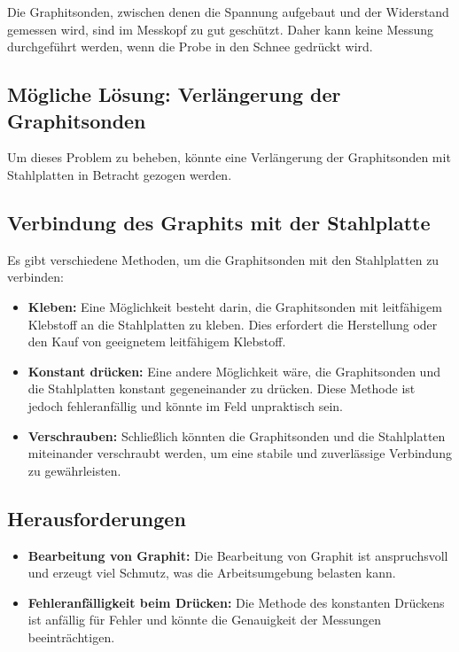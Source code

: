 Die Graphitsonden, zwischen denen die Spannung aufgebaut und der Widerstand gemessen wird, sind im Messkopf zu gut geschützt. Daher kann keine Messung durchgeführt werden, wenn die Probe in den Schnee gedrückt wird.


\subsection{Mögliche Lösung: Verlängerung der Graphitsonden}

Um dieses Problem zu beheben, könnte eine Verlängerung der Graphitsonden mit Stahlplatten in Betracht gezogen werden.

\subsection{Verbindung des Graphits mit der Stahlplatte}

Es gibt verschiedene Methoden, um die Graphitsonden mit den Stahlplatten zu verbinden:

\begin{itemize}
    \item \textbf{Kleben:} Eine Möglichkeit besteht darin, die Graphitsonden mit leitfähigem Klebstoff an die Stahlplatten zu kleben. Dies erfordert die Herstellung oder den Kauf von geeignetem leitfähigem Klebstoff.
    \item \textbf{Konstant drücken:} Eine andere Möglichkeit wäre, die Graphitsonden und die Stahlplatten konstant gegeneinander zu drücken. Diese Methode ist jedoch fehleranfällig und könnte im Feld unpraktisch sein.
    \item \textbf{Verschrauben:} Schließlich könnten die Graphitsonden und die Stahlplatten miteinander verschraubt werden, um eine stabile und zuverlässige Verbindung zu gewährleisten.
\end{itemize}

\subsection{Herausforderungen}

\begin{itemize}
    \item \textbf{Bearbeitung von Graphit:} Die Bearbeitung von Graphit ist anspruchsvoll und erzeugt viel Schmutz, was die Arbeitsumgebung belasten kann.
    \item \textbf{Fehleranfälligkeit beim Drücken:} Die Methode des konstanten Drückens ist anfällig für Fehler und könnte die Genauigkeit der Messungen beeinträchtigen.
\end{itemize}


